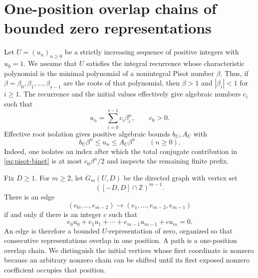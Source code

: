 \section{One-position overlap chains of bounded zero representations}
\label{sec:bounded-zero-transients}

Let $U=(u_n)_{n\ge0}$ be a strictly increasing sequence of positive
integers with $u_0=1$.  We assume that $U$ satisfies the integral recurrence
whose characteristic polynomial is the minimal polynomial of a nonintegral
Pisot number $\beta$.  Thus, if
$\beta=\beta_0,\beta_1,\ldots,\beta_{s-1}$ are the roots of that polynomial,
then $\beta>1$ and $|\beta_i|<1$ for $i\ge1$.  The recurrence and the initial
values effectively give algebraic numbers $c_i$ such that
\begin{equation}
u_n=\sum_{i=0}^{s-1}c_i\beta_i^n,
\qquad c_0>0.
\label{eq:pisot-binet}
\end{equation}
Effective root isolation gives positive algebraic bounds $b_U,A_U$ with
\begin{equation}
b_U\beta^n\le u_n\le A_U\beta^n\qquad(n\ge0).
\label{eq:pisot-effective-growth}
\end{equation}
Indeed, one isolates an index after which the total conjugate contribution
in \eqref{eq:pisot-binet} is at most $c_0\beta^n/2$ and inspects the
remaining finite prefix.

Fix $D\ge1$.  For $m\ge2$, let $G_m(U,D)$ be the directed graph with vertex
set
\[
([-D,D]\cap\mathbb Z)^{m-1}.
\]
There is an edge
\[
(e_0,\ldots,e_{m-2})\longrightarrow
(e_1,\ldots,e_{m-2},e_{m-1})
\]
if and only if there is an integer $c$ such that
\begin{equation}
e_0u_0+e_1u_1+\cdots+e_{m-1}u_{m-1}+cu_m=0.
\label{eq:bounded-zero-overlap-edge}
\end{equation}
An edge is therefore a bounded $U$-representation of zero, organized so
that consecutive representations overlap in one position.  A path is a
one-position overlap chain.  We distinguish the initial vertices whose
first coordinate is nonzero because an arbitrary nonzero chain can be
shifted until its first exposed nonzero coefficient occupies that position.


